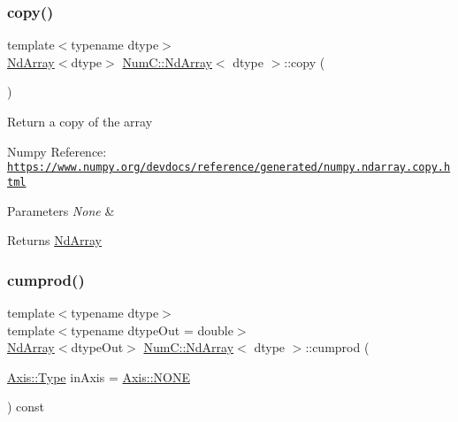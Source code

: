 \subsubsection{\texorpdfstring{copy()}{copy()}}
{\footnotesize\ttfamily template$<$typename dtype$>$ \\
\mbox{\hyperlink{class_num_c_1_1_nd_array}{Nd\+Array}}$<$dtype$>$ \mbox{\hyperlink{class_num_c_1_1_nd_array}{Num\+C\+::\+Nd\+Array}}$<$ dtype $>$\+::copy (\begin{DoxyParamCaption}{ }\end{DoxyParamCaption})\hspace{0.3cm}{\ttfamily [inline]}}

Return a copy of the array

Numpy Reference\+: \href{https://www.numpy.org/devdocs/reference/generated/numpy.ndarray.copy.html}{\tt https\+://www.\+numpy.\+org/devdocs/reference/generated/numpy.\+ndarray.\+copy.\+html}


\begin{DoxyParams}{Parameters}
{\em None} & \\
\hline
\end{DoxyParams}
\begin{DoxyReturn}{Returns}
\mbox{\hyperlink{class_num_c_1_1_nd_array}{Nd\+Array}} 
\end{DoxyReturn}
\mbox{\label{class_num_c_1_1_nd_array_a2a963d6a129add991c1f0a7658a4cfd4}} 
\subsubsection{\texorpdfstring{cumprod()}{cumprod()}}
{\footnotesize\ttfamily template$<$typename dtype$>$ \\
template$<$typename dtype\+Out  = double$>$ \\
\mbox{\hyperlink{class_num_c_1_1_nd_array}{Nd\+Array}}$<$dtype\+Out$>$ \mbox{\hyperlink{class_num_c_1_1_nd_array}{Num\+C\+::\+Nd\+Array}}$<$ dtype $>$\+::cumprod (\begin{DoxyParamCaption}\item[{\mbox{\hyperlink{struct_num_c_1_1_axis_a8e689044ef1941a03482e730c5e7ebb3}{Axis\+::\+Type}}}]{in\+Axis = {\ttfamily \mbox{\hyperlink{struct_num_c_1_1_axis_a8e689044ef1941a03482e730c5e7ebb3a0ae033c4226f7184bf0050b101e7ed94}{Axis\+::\+N\+O\+NE}}} }\end{DoxyParamCaption}) const\hspace{0.3cm}{\ttfamily [inline]}}


